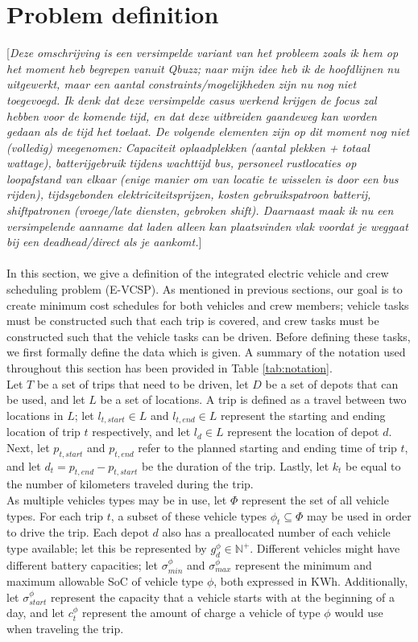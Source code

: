 \documentclass[]{article}
\newcommand{\todonocomment}[1]{{\color{red}[\textit{#1}]}}
\begin{document}
\section{Problem definition}
\label{sec:problem_def}
\todonocomment{Deze omschrijving is een versimpelde variant van het probleem zoals ik hem op het moment heb begrepen vanuit Qbuzz; naar mijn idee heb ik de hoofdlijnen nu uitgewerkt, maar een aantal constraints/mogelijkheden zijn nu nog niet toegevoegd. Ik denk dat deze versimpelde casus werkend krijgen de focus zal hebben voor de komende tijd, en dat deze uitbreiden gaandeweg kan worden gedaan als de tijd het toelaat. De volgende elementen zijn op dit moment nog niet (volledig) meegenomen: Capaciteit oplaadplekken (aantal plekken + totaal wattage), batterijgebruik tijdens wachttijd bus, personeel rustlocaties op loopafstand van elkaar (enige manier om van locatie te wisselen is door een bus rijden), tijdsgebonden elektriciteitsprijzen, kosten gebruikspatroon batterij, shiftpatronen (vroege/late diensten, gebroken shift). Daarnaast maak ik nu een versimpelende aanname dat laden alleen kan plaatsvinden vlak voordat je weggaat bij een deadhead/direct als je aankomt.} \\\\
In this section, we give a definition of the integrated electric vehicle and crew scheduling problem (E-VCSP). As mentioned in previous sections, our goal is to create minimum cost schedules for both vehicles and crew members; vehicle tasks must be constructed such that each trip is covered, and crew tasks must be constructed such that the vehicle tasks can be driven. Before defining these tasks, we first formally define the data which is given. A summary of the notation used throughout this section has been provided in Table \ref{tab:notation}. \\
Let $T$ be a set of trips that need to be driven, let $D$ be a set of depots that can be used, and let $L$ be a set of locations. A trip is defined as a travel between two locations in $L$; let $l_{t,start} \in L$ and $l_{t,end} \in L$ represent the starting and ending location of trip $t$ respectively, and let $l_d \in L$ represent the location of depot $d$. Next, let $p_{t,start}$ and $p_{t,end}$ refer to the planned starting and ending time of trip $t$, and let $d_t = p_{t,end} - p_{t,start}$ be the duration of the trip. Lastly, let $k_t$ be equal to the number of kilometers traveled during the trip. \\
As multiple vehicles types may be in use, let $\Phi$ represent the set of all vehicle types. For each trip $t$, a subset of these vehicle types $\phi_t \subseteq \Phi$ may be used in order to drive the trip. Each depot $d$ also has a preallocated number of each vehicle type available; let this be represented by $g^\phi_{d} \in \mathbb{N}^+$. Different vehicles might have different battery capacities; let $\sigma^\phi_{min}$ and $\sigma^\phi_{max}$ represent the minimum and maximum allowable SoC of vehicle type $\phi$, both expressed in KWh. Additionally, let $\sigma^\phi_{start}$ represent the capacity that a vehicle starts with at the beginning of a day, and let $c^\phi_t$ represent the amount of charge a vehicle of type $\phi$ would use when traveling the trip. \\
\end{document}
